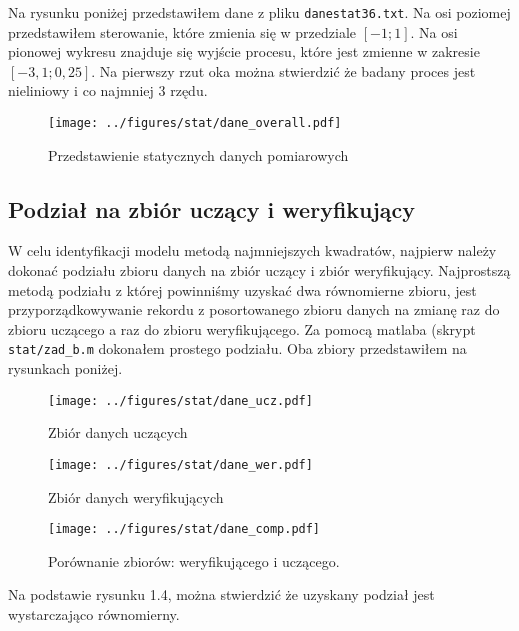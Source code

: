 \documentclass[a4paper,titlepage,11pt,floatssmall]{mwrep}
\begin{document}
\indent Na rysunku poniżej przedstawiłem dane z pliku \texttt{danestat36.txt}. Na osi poziomej przedstawiłem sterowanie, które zmienia się w przedziale $[-1; 1]$. Na osi pionowej wykresu znajduje się wyjście procesu, które jest zmienne w zakresie $[-3,1; 0,25]$. Na pierwszy rzut oka można stwierdzić że badany proces jest nieliniowy i co najmniej 3 rzędu.
\bigskip
\begin{figure}[H]
\centering
\texttt{[image: ../figures/stat/dane\_overall.pdf]}
\caption{Przedstawienie statycznych danych pomiarowych}
\end{figure}


\newpage
\subsection{Podział na zbiór uczący i weryfikujący}
\indent W celu identyfikacji modelu metodą najmniejszych kwadratów, najpierw należy dokonać podziału zbioru danych na zbiór uczący i zbiór weryfikujący. Najprostszą metodą podziału z której powinniśmy uzyskać dwa równomierne zbioru, jest przyporządkowywanie rekordu z posortowanego zbioru danych na zmianę raz do zbioru uczącego a raz do zbioru weryfikującego. Za pomocą matlaba (skrypt \texttt{stat/zad\_{}b.m} dokonałem prostego podziału. Oba zbiory przedstawiłem na rysunkach poniżej.

\begin{figure}[H]
\centering
\texttt{[image: ../figures/stat/dane\_ucz.pdf]}
\caption{Zbiór danych uczących}
\end{figure}

\begin{figure}[H]
\centering
\texttt{[image: ../figures/stat/dane\_wer.pdf]}
\caption{Zbiór danych weryfikujących}
\end{figure}

\begin{figure}[H]
\centering
\texttt{[image: ../figures/stat/dane\_comp.pdf]}
\caption{Porównanie zbiorów: weryfikującego i uczącego.}
\end{figure}

\indent Na podstawie rysunku 1.4, można stwierdzić że uzyskany podział jest wystarczająco równomierny. 
\end{document}
